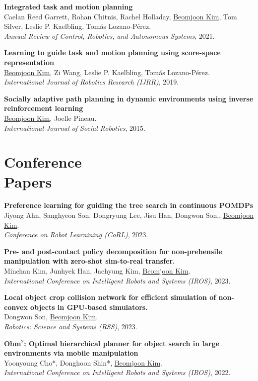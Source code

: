 \documentclass[line,margin,letterpaper]{res}
\begin{document}
\begin{resume}
\textbf{Integrated task and motion planning}\\
Caelan Reed Garrett, Rohan Chitnis, Rachel Holladay, \underline{Beomjoon Kim}, Tom Silver, Leslie P. Kaelbling, Tom\'as Lozano-P\'erez.\\
{\sl Annual Review of Control, Robotics, and Autonomous Systems}, 2021.

\textbf{Learning to guide task and motion planning using score-space representation}\\
\underline{Beomjoon Kim}, Zi Wang, Leslie P. Kaelbling, Tom\'as Lozano-P\'erez.\\
{\sl International Journal of Robotics Research (IJRR)}, 2019.

\textbf{Socially adaptive path planning in dynamic environments using inverse reinforcement learning}\\
\underline{Beomjoon Kim}, Joelle Pineau.\\
{\sl International Journal of Social Robotics}, 2015.

\section{Conference \\Papers}
\textbf{Preference learning for guiding the tree search in continuous POMDPs
}\\
Jiyong Ahn, Sanghyeon Son, Dongryung Lee, Jisu Han, Dongwon Son,, \underline{Beomjoon Kim}. \\
{\sl Conference on Robot Learnining (CoRL)}, 2023.


\textbf{Pre- and post-contact policy decomposition for non-prehensile manipulation with zero-shot sim-to-real transfer.
}\\
Minchan Kim, Junhyek Han, Jaehyung Kim, \underline{Beomjoon Kim}. \\
{\sl International Conference on Intelligent Robots and Systems (IROS)}, 2023.


\textbf{Local object crop collision network for efficient simulation of non-convex objects in GPU-based simulators.
}\\
Dongwon Son, \underline{Beomjoon Kim}. \\
{\sl Robotics: Science and Systems (RSS)}, 2023.

\textbf{Ohm$^2$: Optimal hierarchical planner for object search in large environments via mobile manipulation}\\
Yoonyoung Cho*, Donghoon Shin*, \underline{Beomjoon Kim}. \\
{\sl International Conference on Intelligent Robots and Systems (IROS)}, 2022.


\end{resume}
\end{document}

